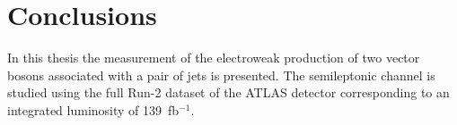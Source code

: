 \chapter{Conclusions}
\label{chap:conclusions}

In this thesis the measurement of the electroweak production of two vector bosons associated with a pair of jets is presented.
The semileptonic channel is studied using the full Run-2 dataset of the ATLAS detector corresponding to an integrated luminosity of 139~fb$^{-1}$.







